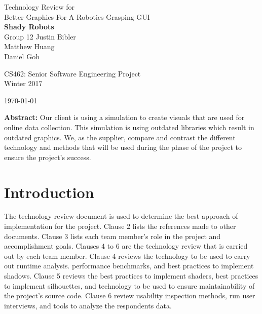\documentclass[10pt,journal,compsoc,draftclsnofoot]{IEEEtran}
\begin{document}
\onecolumn

\begin{titlepage}
\null
\vspace{20mm}

\begin{flushleft}
\begin{bfseries}
	\vskip2mm
	\Huge{Technology Review for\\ Better Graphics For A Robotics Grasping GUI}\\
	\vspace{30mm}
	\textbf{\huge Shady Robots} \\
	\vskip2mm
	\large{Group 12}
	\vskip5mm
	\Large{Justin Bibler \\
	Matthew Huang \\
	Daniel Goh \\}
\end{bfseries}

\vspace{15mm}
\Large{CS462: Senior Software Engineering Project} \\
\Large{Winter 2017} \\

\vspace{10mm}

\today

\vfill

\begin{normalsize}
{\bf Abstract:}
Our client is using a simulation to create visuals that are used for online data collection.
This simulation is using outdated libraries which result in outdated graphics.
We, as the supplier, compare and contrast the different technology and methods that will be used during the phase of the project to ensure the project's success.
\end{normalsize}
\end{flushleft}
\end{titlepage}

\section{Introduction}
\vspace{3mm}
The technology review document is used to determine the best approach of implementation for the project. 
Clause 2 lists the references made to other documents.
Clause 3 lists each team member's role in the project and accomplishment goals.
Clauses 4 to 6 are the technology review that is carried out by each team member.
Clause 4 reviews the technology to be used to carry out runtime analysis. performance benchmarks, and best practices to implement shadows.
Clause 5 reviews the best practices to implement shaders, best practices to implement silhouettes, and technology to be used to ensure maintainability of the project's source code.
Clause 6 review usability inspection methods, run user interviews, and tools to analyze the respondents data.
\end{document}
